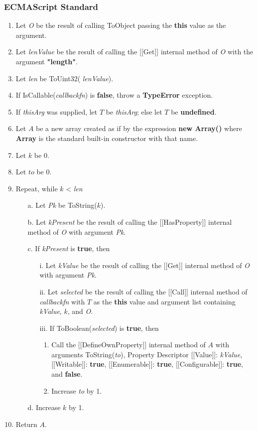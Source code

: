 \documentclass[a4paper,11pt,twoside]{report}
\begin{document}
\subsubsection{ECMAScript Standard}
\begin{enumerate}
\item Let \textit{O} be the result of calling ToObject passing the \textbf{this} value as the argument.
\item Let \textit{lenValue} be the result of calling the [[Get]] internal method of \textit{O} with the argument \textbf{"length"}.
\item Let \textit{len} be ToUint32( \textit{lenValue}).
\item If IsCallable(\textit{callbackfn}) is \textbf{false}, throw a \textbf{TypeError} exception.
\item If \textit{thisArg} was supplied, let $T$ be \textit{thisArg}; else let $T$ be \textbf{undefined}.
\item Let $A$ be a new array created as if by the expression \textbf{new Array()} where \textbf{Array} is the standard built-in constructor with that name.
\item Let $k$ be 0.
\item Let $to$ be 0.
\item Repeat, while $k$ < \textit{len}
\begin{enumerate}
\item[a.] Let \textit{Pk} be ToString($k$).
\item[b.] Let \textit{kPresent} be the result of calling the [[HasProperty]] internal method of \textit{O} with argument \textit{Pk}.
\item[c.] If \textit{kPresent} is \textbf{true}, then
\begin{enumerate}
\item[i.] Let \textit{kValue} be the result of calling the [[Get]] internal method of \textit{O} with argument \textit{Pk}.
\item[ii.] Let \textit{selected} be the result of calling the [[Call]] internal method of \textit{callbackfn} with $T$ as the \textbf{this} value and argument list containing \textit{kValue}, $k$, and \textit{O}.
\item[iii.] If ToBoolean(\textit{selected}) is \textbf{true}, then
\begin{enumerate}
\item Call the [[DefineOwnProperty]] internal method of $A$ with arguments ToString(\textit{to}), Property Descriptor {[[Value]]: \textit{kValue}, [[Writable]]: \textbf{true}, [[Enumerable]]: \textbf{true}, [[Configurable]]: \textbf{true}}, and \textbf{false}.
\item Increase \textit{to} by 1.
\end{enumerate}
\end{enumerate}
\item[d.] Increase $k$ by 1.
\end{enumerate}
\item Return $A$.
\end{enumerate}
\end{document}
